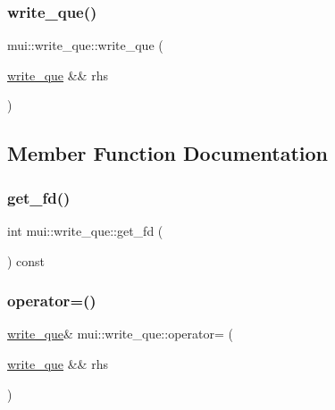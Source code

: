 \mbox{\label{classmui_1_1write__que_a6d5f8899f6816de6b37bb555501d7ede}} 
\subsubsection{\texorpdfstring{write\+\_\+que()}{write\_que()}\hspace{0.1cm}{\footnotesize\ttfamily [2/2]}}
{\footnotesize\ttfamily mui\+::write\+\_\+que\+::write\+\_\+que (\begin{DoxyParamCaption}\item[{\hyperlink{classmui_1_1write__que}{write\+\_\+que} \&\&}]{rhs }\end{DoxyParamCaption})\hspace{0.3cm}{\ttfamily [inline]}}



\subsection{Member Function Documentation}
\mbox{\label{classmui_1_1write__que_aa3faa6da78c6adae87d96e06454d98f3}} 
\subsubsection{\texorpdfstring{get\+\_\+fd()}{get\_fd()}}
{\footnotesize\ttfamily int mui\+::write\+\_\+que\+::get\+\_\+fd (\begin{DoxyParamCaption}{ }\end{DoxyParamCaption}) const\hspace{0.3cm}{\ttfamily [inline]}}

\mbox{\label{classmui_1_1write__que_a81fe7b2b456cb72299228d871b822a44}} 
\subsubsection{\texorpdfstring{operator=()}{operator=()}}
{\footnotesize\ttfamily \hyperlink{classmui_1_1write__que}{write\+\_\+que}\& mui\+::write\+\_\+que\+::operator= (\begin{DoxyParamCaption}\item[{\hyperlink{classmui_1_1write__que}{write\+\_\+que} \&\&}]{rhs }\end{DoxyParamCaption})\hspace{0.3cm}{\ttfamily [inline]}}

